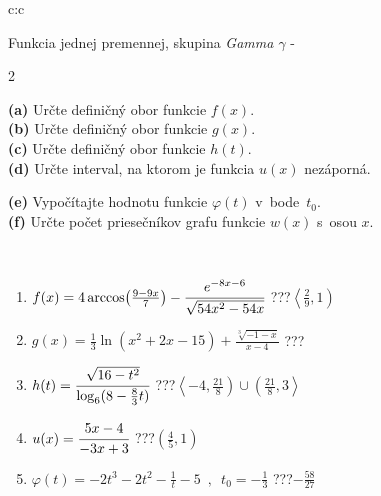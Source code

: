 \documentclass[10pt]{report}
\begin{document}
\begin{tabular}{c:c}
\begin{minipage}[c][104.5mm][t]{0.5\linewidth}
\begin{center}
\vspace{7mm}
{\huge Funkcia jednej premennej, skupina \textit{Gamma $\gamma$} -}\\[5mm]
\begin{minipage}{0.95\linewidth}
\begin{center}
{\small \begin{multicols}{2} \raggedright
\textbf{(a)} Určte definičný obor funkcie \(f(x)\). \\[1mm]
\textbf{(b)} Určte definičný obor funkcie \(g(x)\). \\[1mm]
\textbf{(c)} Určte definičný obor funkcie \(h(t)\). \\[1mm]
\textbf{(d)} Určte interval, na ktorom je funkcia \(u(x)\) nezáporná. \par \columnbreak
\textbf{(e)} Vypočítajte hodnotu funkcie \(\varphi(t)\) v~bode~\(t_0\). \\[1mm]
\textbf{(f)} Určte počet priesečníkov grafu funkcie \(w(x)\) s~osou \(x\). \\[1mm]
\end{multicols}
}
\end{center}
\end{minipage}
\\[4mm]
\begin{minipage}{0.79\linewidth}
\begin{center}
\begin{varwidth}{\linewidth}
\begin{enumerate}
\small
\item $f(x) = 4\arccos\!\left( \frac{9-9x}{7} \right) - \cfrac{e^{-8x-6}}{\sqrt{54x^2-54x}}$\quad \dotfill\; ???\;\dotfill \quad $\left\langle\frac{2}{9} , 1\right)$
\item $g(x) = \frac{1}{3} \ln{\!(x^2+2x-15)}+\frac{\sqrt[3]{-1-x}}{x-4}$\quad \dotfill\; ???\;\dotfill {}
\item $h(t) = \cfrac{\sqrt{16-t^2}}{\log_6(8-\frac{8}{3}t)}$\quad \dotfill\; ???\;\dotfill \quad $\left\langle-4 , \frac{21}{8}\right)\cup\left(\frac{21}{8} , 3\right\rangle$
\item $u(x) = \cfrac{5x-4}{-3x+3}$\quad \dotfill\; ???\;\dotfill \quad $\left(\frac{4}{5} , 1\right)$
\item $\varphi(t) = -2t^3-2t^2-\frac{1}{t}-5 \enspace , \enspace t_0=-\frac{1}{3}$\quad \dotfill\; ???\;\dotfill \quad $-\frac{58}{27}$

\end{enumerate}
\end{varwidth}
\end{center}
\end{minipage}
\end{center}
\end{minipage}
\end{tabular}
\end{document}
